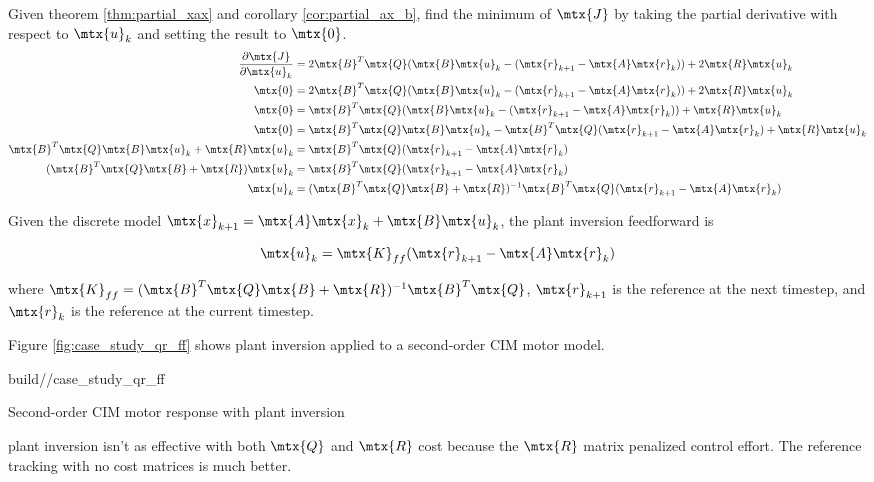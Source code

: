 Given theorem \ref{thm:partial_xax} and corollary \ref{cor:partial_ax_b}, find
the minimum of $\mtx{J}$ by taking the partial derivative with respect to
$\mtx{u}_k$ and setting the result to $\mtx{0}$.
\begin{align*}
  \frac{\partial\mtx{J}}{\partial\mtx{u}_k} &= 2\mtx{B}^T\mtx{Q}
    (\mtx{B}\mtx{u}_k - (\mtx{r}_{k+1} - \mtx{A}\mtx{r}_k)) +
    2\mtx{R}\mtx{u}_k \\
  \mtx{0} &= 2\mtx{B}^T\mtx{Q}
    (\mtx{B}\mtx{u}_k - (\mtx{r}_{k+1} - \mtx{A}\mtx{r}_k)) +
    2\mtx{R}\mtx{u}_k \\
  \mtx{0} &= \mtx{B}^T\mtx{Q}
    (\mtx{B}\mtx{u}_k - (\mtx{r}_{k+1} - \mtx{A}\mtx{r}_k)) +
    \mtx{R}\mtx{u}_k \\
  \mtx{0} &= \mtx{B}^T\mtx{Q}\mtx{B}\mtx{u}_k -
    \mtx{B}^T\mtx{Q}(\mtx{r}_{k+1} - \mtx{A}\mtx{r}_k) + \mtx{R}\mtx{u}_k \\
  \mtx{B}^T\mtx{Q}\mtx{B}\mtx{u}_k + \mtx{R}\mtx{u}_k &=
    \mtx{B}^T\mtx{Q}(\mtx{r}_{k+1} - \mtx{A}\mtx{r}_k) \\
  (\mtx{B}^T\mtx{Q}\mtx{B} + \mtx{R})\mtx{u}_k &=
    \mtx{B}^T\mtx{Q}(\mtx{r}_{k+1} - \mtx{A}\mtx{r}_k) \\
  \mtx{u}_k &= (\mtx{B}^T\mtx{Q}\mtx{B} + \mtx{R})^{-1}
    \mtx{B}^T\mtx{Q}(\mtx{r}_{k+1} - \mtx{A}\mtx{r}_k)
\end{align*}
\begin{theorem}
  Given the discrete model
  $\mtx{x}_{k+1} = \mtx{A}\mtx{x}_k + \mtx{B}\mtx{u}_k$, the plant inversion
  feedforward is

  \begin{equation*}
    \mtx{u}_k = \mtx{K}_{ff} (\mtx{r}_{k+1} - \mtx{A}\mtx{r}_k)
  \end{equation*}

  where
  $\mtx{K}_{ff} = (\mtx{B}^T\mtx{Q}\mtx{B} + \mtx{R})^{-1}\mtx{B}^T\mtx{Q}$,
  $\mtx{r}_{k+1}$ is the reference at the next timestep, and $\mtx{r}_k$ is the
  reference at the current timestep.
\end{theorem}

Figure \ref{fig:case_study_qr_ff} shows \gls{plant} inversion applied to a
second-order CIM motor model.
\begin{svg}{build/\partpath/case_study_qr_ff}
  \caption{Second-order CIM motor response with plant inversion}
  \label{fig:case_study_qr_ff}
\end{svg}

\Gls{plant} inversion isn't as effective with both $\mtx{Q}$ and $\mtx{R}$ cost
because the $\mtx{R}$ matrix penalized \gls{control effort}. The \gls{reference}
\gls{tracking} with no cost matrices is much better.

